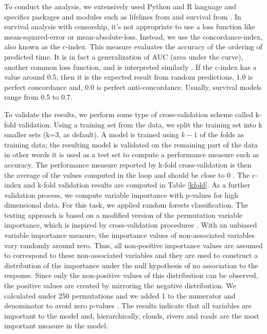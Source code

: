 To conduct the analysis, we extensively used Python and R language and specifics packages and modules such as lifelines from \citet{cameron_2018} and survival from \citet{survival-book,survival-package}. In survival analysis with censorship, it’s not appropriate to use a loss function like mean-squared-error or mean-absolute-loss. Instead, we use the concordance-index, also known as the c-index. This measure evaluates the accuracy of the ordering of predicted time. It is in fact a generalization of AUC (area under the curve), another common loss function, and is interpreted similarly \citep{cameron_2018}. If the c-index has a value around 0.5, then it is the expected result from random predictions, 1.0 is perfect concordance and, 0.0 is perfect anti-concordance. Usually, survival models range from 0.5 to 0.7.

To validate the results, we perform some type of cross-validation scheme called k-fold validation. Using a training set from the data, we split the training set into k smaller sets (k=3, as default). A model is trained using $k-1$ of the folds as training data;
the resulting model is validated on the remaining part of the data in other words it is used as a test set to compute a performance measure such as accuracy. The performance measure reported by k-fold cross-validation is then the average of the values computed in the loop and should be close to 0 \citep{scikit-learn}. The c-index and k-fold validation results are computed in Table \ref{kfold}. As a further validation process, we compute variable importance with p-values for high dimensional data. For this task, we applied random forests classification. The testing approach is based on a modified version of the permutation variable importance, which is inspired by cross-validation procedures \citep{Janitza2016}. With an unbiased variable importance measure, the importance values of non-associated variables vary randomly around zero. Thus, all non-positive importance values are assumed to correspond to these non-associated variables and they are used to construct a distribution of the importance under the null hypothesis of no association to the response. Since only the non-positive values of this distribution can be observed, the positive values are created by mirroring the negative distribution. We calculated under 250 permutations and we added 1 to the numerator and denominator to avoid zero p-values \citep{ranger_2018}. The results indicate that all variables are important to the model and, hierarchically, clouds, rivers and roads are the most important measure in the model.

